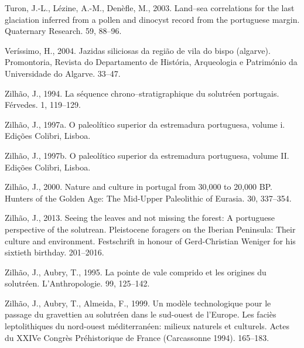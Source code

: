 \documentclass[12pt,twoside]{reedthesis}
\begin{document}
\leavevmode\hypertarget{ref-turon2003}{}%
Turon, J.-L., Lézine, A.-M., Denèfle, M., 2003. Land--sea correlations for the last glaciation inferred from a pollen and dinocyst record from the portuguese margin. Quaternary Research. 59, 88--96.

\leavevmode\hypertarget{ref-verissimo2004}{}%
Veríssimo, H., 2004. Jazidas siliciosas da região de vila do bispo (algarve). Promontoria, Revista do Departamento de História, Arqueologia e Património da Universidade do Algarve. 33--47.

\leavevmode\hypertarget{ref-zilhao1994}{}%
Zilhão, J., 1994. La séquence chrono--stratigraphique du solutréen portugais. Férvedes. 1, 119--129.

\leavevmode\hypertarget{ref-zilhao1997}{}%
Zilhão, J., 1997a. O paleolítico superior da estremadura portuguesa, volume i. Edições Colibri, Lisboa.

\leavevmode\hypertarget{ref-zilhao1997b}{}%
Zilhão, J., 1997b. O paleolítico superior da estremadura portuguesa, volume II. Edições Colibri, Lisboa.

\leavevmode\hypertarget{ref-zilhao2000}{}%
Zilhão, J., 2000. Nature and culture in portugal from 30,000 to 20,000 BP. Hunters of the Golden Age: The Mid-Upper Paleolithic of Eurasia. 30, 337--354.

\leavevmode\hypertarget{ref-zilhao2013}{}%
Zilhão, J., 2013. Seeing the leaves and not missing the forest: A portuguese perspective of the solutrean. Pleistocene foragers on the Iberian Peninsula: Their culture and environment. Festschrift in honour of Gerd-Christian Weniger for his sixtieth birthday. 201--2016.

\leavevmode\hypertarget{ref-zilhaoetal1995}{}%
Zilhão, J., Aubry, T., 1995. La pointe de vale comprido et les origines du solutréen. L'Anthropologie. 99, 125--142.

\leavevmode\hypertarget{ref-zilhaoetal1999}{}%
Zilhão, J., Aubry, T., Almeida, F., 1999. Un modèle technologique pour le passage du gravettien au solutréen dans le sud-ouest de l'Europe. Les faciès leptolithiques du nord-ouest méditerranéen: milieux naturels et culturels. Actes du XXIVe Congrès Préhistorique de France (Carcassonne 1994). 165--183.

\appendix
\end{document}
